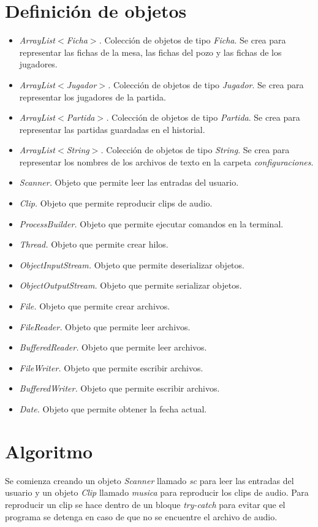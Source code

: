 \documentclass[12pt]{article}
\begin{document}
  \section{Definición de objetos}
  \begin{itemize}
    \item \textit{ArrayList$<$Ficha$>$.} Colección de objetos de tipo \textit{Ficha}. Se crea para representar las fichas de la mesa, las fichas del pozo y las fichas de los jugadores.
    \item \textit{ArrayList$<$Jugador$>$.} Colección de objetos de tipo \textit{Jugador}. Se crea para representar los jugadores de la partida.
    \item \textit{ArrayList$<$Partida$>$.} Colección de objetos de tipo \textit{Partida}. Se crea para representar las partidas guardadas en el historial.
    \item \textit{ArrayList$<$String$>$.} Colección de objetos de tipo \textit{String}. Se crea para representar los nombres de los archivos de texto en la carpeta \textit{configuraciones}.
    \item \textit{Scanner.} Objeto que permite leer las entradas del usuario.
    \item \textit{Clip.} Objeto que permite reproducir clips de audio.
    \item \textit{ProcessBuilder.} Objeto que permite ejecutar comandos en la terminal.
    \item \textit{Thread.} Objeto que permite crear hilos.
    \item \textit{ObjectInputStream.} Objeto que permite deserializar objetos.
    \item \textit{ObjectOutputStream.} Objeto que permite serializar objetos.
    \item \textit{File.} Objeto que permite crear archivos.
    \item \textit{FileReader.} Objeto que permite leer archivos.
    \item \textit{BufferedReader.} Objeto que permite leer archivos.
    \item \textit{FileWriter.} Objeto que permite escribir archivos.
    \item \textit{BufferedWriter.} Objeto que permite escribir archivos.
    \item \textit{Date.} Objeto que permite obtener la fecha actual.
  \end{itemize}

  \section{Algoritmo}
  Se comienza creando un objeto \textit{Scanner} llamado \textit{sc} para leer las entradas del usuario y un objeto \textit{Clip} llamado \textit{musica} para reproducir los clips de audio. Para reproducir un clip se hace dentro de un bloque \textit{try-catch} para evitar que el programa se detenga en caso de que no se encuentre el archivo de audio.
\end{document}
